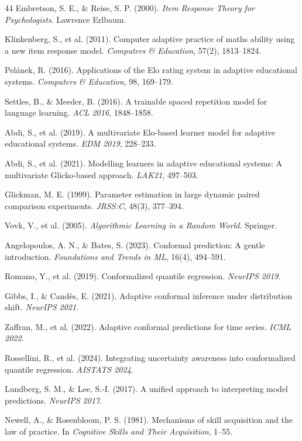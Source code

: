\documentclass[11pt]{article}
\begin{document}
\begin{thebibliography}{44}
Embretson, S. E., \& Reise, S. P. (2000). \textit{Item Response Theory for Psychologists}.
Lawrence Erlbaum.

Klinkenberg, S., et al. (2011). Computer adaptive practice of maths ability using a new
item response model. \textit{Computers \& Education}, 57(2), 1813--1824.

Pel\'{a}nek, R. (2016). Applications of the Elo rating system in adaptive educational
systems. \textit{Computers \& Education}, 98, 169--179.

Settles, B., \& Meeder, B. (2016). A trainable spaced repetition model for language learning.
\textit{ACL 2016}, 1848--1858.

Abdi, S., et al. (2019). A multivariate Elo-based learner model for adaptive educational
systems. \textit{EDM 2019}, 228--233.

Abdi, S., et al. (2021). Modelling learners in adaptive educational systems: A multivariate
Glicko-based approach. \textit{LAK21}, 497--503.

Glickman, M. E. (1999). Parameter estimation in large dynamic paired comparison
experiments. \textit{JRSS:C}, 48(3), 377--394.

Vovk, V., et al. (2005). \textit{Algorithmic Learning in a Random World}. Springer.

Angelopoulos, A. N., \& Bates, S. (2023). Conformal prediction: A gentle introduction.
\textit{Foundations and Trends in ML}, 16(4), 494--591.

Romano, Y., et al. (2019). Conformalized quantile regression. \textit{NeurIPS 2019}.

Gibbs, I., \& Cand\`{e}s, E. (2021). Adaptive conformal inference under distribution shift.
\textit{NeurIPS 2021}.

Zaffran, M., et al. (2022). Adaptive conformal predictions for time series.
\textit{ICML 2022}.

Rossellini, R., et al. (2024). Integrating uncertainty awareness into conformalized
quantile regression. \textit{AISTATS 2024}.

Lundberg, S. M., \& Lee, S.-I. (2017). A unified approach to interpreting model
predictions. \textit{NeurIPS 2017}.

Newell, A., \& Rosenbloom, P. S. (1981). Mechanisms of skill acquisition and the law of
practice. In \textit{Cognitive Skills and Their Acquisition}, 1--55.


\end{thebibliography}
\end{document}
